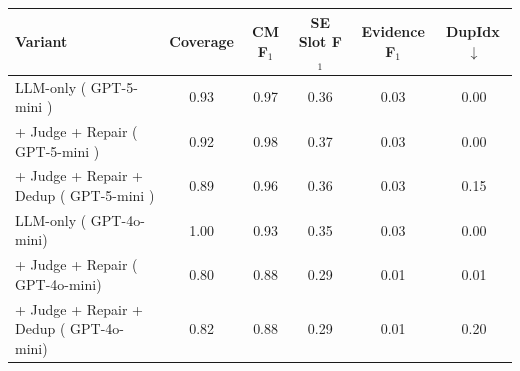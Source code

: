 \begin{tabularx}{\textwidth}{@{}l c c c c c@{}}
\toprule
\textbf{Variant} & \textbf{Coverage} & \textbf{CM F$_1$} & \textbf{SE Slot F$_1$} & \textbf{Evidence F$_1$} & \textbf{DupIdx}\,$\downarrow$ \\
\midrule
LLM-only ( GPT-5-mini ) & 0.93 & 0.97 & 0.36 & 0.03 & 0.00 \\
+ Judge + Repair ( GPT-5-mini ) & 0.92 & 0.98 & 0.37 & 0.03 & 0.00 \\
+ Judge + Repair + Dedup ( GPT-5-mini ) & 0.89 & 0.96 & 0.36 & 0.03 & 0.15 \\
LLM-only ( GPT-4o-mini) & 1.00 & 0.93 & 0.35 & 0.03 & 0.00 \\
+ Judge + Repair ( GPT-4o-mini) & 0.80 & 0.88 & 0.29 & 0.01 & 0.01 \\
+ Judge + Repair + Dedup  ( GPT-4o-mini) & 0.82 & 0.88 & 0.29 & 0.01 & 0.20 \\
\bottomrule
\end{tabularx}